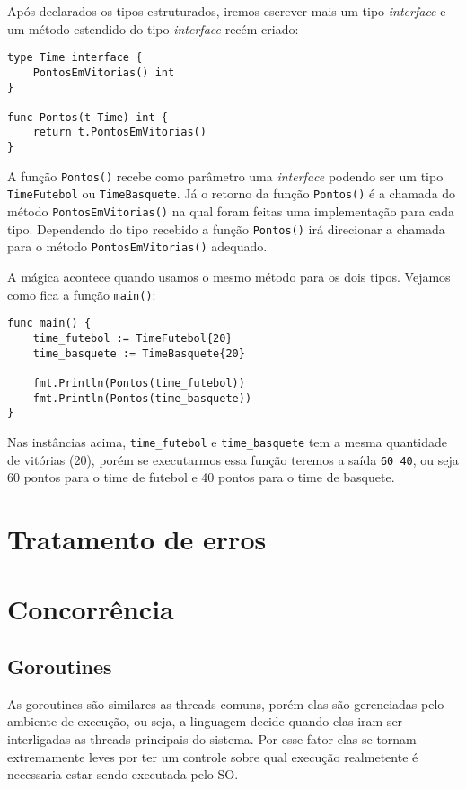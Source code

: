 \documentclass{SBCbookchapter}
\begin{document}
Após declarados os tipos estruturados, iremos escrever mais um tipo \textit{interface} e um método estendido do tipo \textit{interface} recém criado:

\begin{lstlisting}
type Time interface {
	PontosEmVitorias() int
}

func Pontos(t Time) int {
	return t.PontosEmVitorias()
}
\end{lstlisting}

A função \texttt{Pontos()} recebe como parâmetro uma \textit{interface} podendo ser um tipo \texttt{TimeFutebol} ou \texttt{TimeBasquete}. Já o retorno da função \texttt{Pontos()} é a chamada do método \texttt{PontosEmVitorias()} na qual foram feitas uma implementação para cada tipo. Dependendo do tipo recebido a função \texttt{Pontos()} irá direcionar a chamada para o método \texttt{PontosEmVitorias()} adequado.

A mágica acontece quando usamos o mesmo método para os dois tipos. Vejamos como fica a função \texttt{main()}:

\begin{lstlisting}
func main() {
	time_futebol := TimeFutebol{20}
	time_basquete := TimeBasquete{20}
	
	fmt.Println(Pontos(time_futebol))
	fmt.Println(Pontos(time_basquete))
}
\end{lstlisting}

\label{duck}

Nas instâncias acima, \texttt{time\_futebol} e \texttt{time\_basquete} tem a mesma quantidade de vitórias (20), porém se executarmos essa função teremos a saída \texttt{60 40}, ou seja 60 pontos para o time de futebol e 40 pontos para o time de basquete.



\section{Tratamento de erros}

\section{Concorrência}
\subsection{Goroutines}

As goroutines são similares as threads comuns, porém elas são gerenciadas pelo ambiente de execução, ou seja, a linguagem decide quando elas iram ser interligadas as threads principais do sistema. Por esse fator elas se tornam extremamente leves por ter um controle sobre qual execução realmetente é necessaria estar sendo executada pelo SO.
\end{document}
